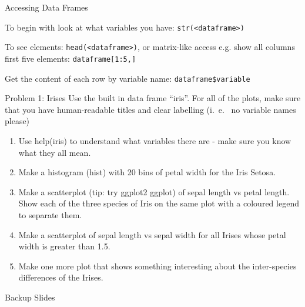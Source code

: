 \documentclass{beamer}
\begin{document}
\begin{frame}{Accessing Data Frames}

To begin with look at what variables you have: \texttt{str(<dataframe>)}

\vspace{5mm}

To see elements: \texttt{head(<dataframe>)}, or matrix-like access e.g. show all columns first five elements: \texttt{dataframe[1:5,]}

\vspace{5mm}

Get the content of each row by variable name: \texttt{dataframe\$variable}


\end{frame}


\begin{frame}{Problem 1: Irises}
Use the built in data frame ``iris''.  For all of the plots, make sure that you have human-readable titles and clear labelling (i.~e.~ no variable names please)

\begin{enumerate}
\item Use help(iris) to understand what variables there are - make sure you know what they all mean.
\item Make a histogram (hist) with 20 bins of petal width for the Iris Setosa.
\item Make a scatterplot (tip: try ggplot2 ggplot) of sepal length vs petal length.  Show each of the three species of Iris on the same plot with a coloured legend to separate them.
\item Make a scatterplot of sepal length vs sepal width for all Irises whose petal width is greater than 1.5.
\item Make one more plot that shows something interesting about the inter-species differences of the Irises.
\end{enumerate}


\end{frame}




\appendix
{}
\setcounter{finalframe}{\value{framenumber}}

\begin{frame}{Backup Slides}
\end{frame}




\setcounter{framenumber}{\value{finalframe}}
\end{document}
